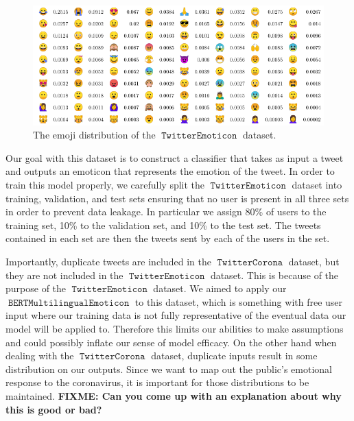 \documentclass[11pt]{article}
\newcommand{\fixme}[1]{\textbf{FIXME: {#1}}}
\DeclareMathOperator{\model}{\texttt{BERTMultilingualEmoticon}}
\DeclareMathOperator{\emoticon}{\texttt{TwitterEmoticon}}
\DeclareMathOperator{\corona}{\texttt{TwitterCorona}}
\begin{document}
\begin{figure}[ht]
    \centering
    \includegraphics[scale = 1.2]{images/emojitable.pdf}
    \caption{The emoji distribution of the $\emoticon$ dataset.} 
    \label{table:lang}
\end{figure}






Our goal with this dataset is to construct a classifier that takes as input a tweet and outputs an emoticon that represents the emotion of the tweet.
In order to train this model properly,
we carefully split the $\emoticon$ dataset into training, validation, and test sets ensuring that no user is present in all three sets in order to prevent data leakage.
In particular we assign 80\% of users to the training set, 10\% to the validation set, and 10\% to the test set.
The tweets contained in each set are then the tweets sent by each of the users in the set.

Importantly, duplicate tweets are included in the $\corona$ dataset,
but they are not included in the $\emoticon$ dataset.
This is because of the purpose of the $\emoticon$ dataset. 
We aimed to apply our $\model$ to this dataset,
which is something with free user input where our training data is not fully representative of the eventual data our model will be applied to.
Therefore this limits our abilities to make assumptions and could possibly inflate our sense of model efficacy.
On the other hand when dealing with the $\corona$ dataset,
duplicate inputs result in some distribution on our outputs.
Since we want to map out the public's emotional response to the coronavirus, it is important 
for those distributions to be maintained.
\fixme{Can you come up with an explanation about why this is good or bad?}
\end{document}
